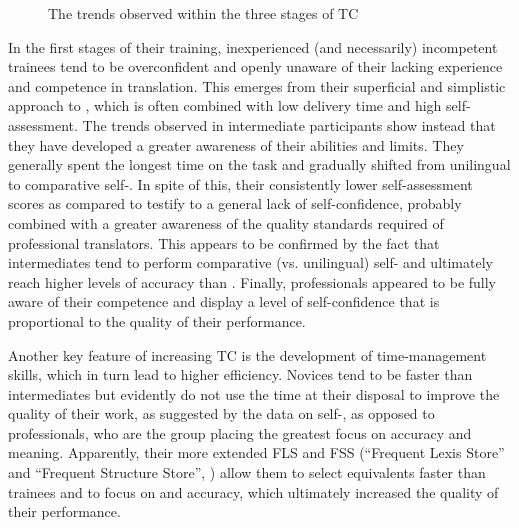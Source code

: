 \documentclass[output=paper]{LSP/langsci}
\begin{document}
\begin{figure}
{
    }
    \caption{The trends observed within the three stages of TC}
    \label{quinci:fig:8}
\end{figure}

In the first stages of their training, inexperienced (and necessarily) incompetent trainees tend to be overconfident and openly unaware of their lacking experience and competence in translation. This emerges from their superficial and simplistic approach to , which is often combined with low delivery time and high self-assessment. The trends observed in intermediate participants show instead that they have developed a greater awareness of their abilities and limits. They generally spent the longest time on the task and gradually shifted from unilingual to comparative self-. In spite of this, their consistently lower self-assessment scores as compared to  testify to a general lack of self-confidence, probably combined with a greater awareness of the quality standards required of professional translators. This appears to be confirmed by the fact that intermediates tend to perform comparative (vs. unilingual) self- and ultimately reach higher levels of accuracy than . Finally, professionals appeared to be fully aware of their competence and display a level of self-confidence that is proportional to the quality of their performance.

Another key feature of increasing TC is the development of time-management skills, which in turn lead to higher efficiency. Novices tend to be faster than intermediates but evidently do not use the time at their disposal to improve the quality of their work, as suggested by the data on self-, as opposed to professionals, who are the group placing the greatest focus on accuracy and meaning. Apparently, their more extended FLS and FSS (``Frequent Lexis Store'' and ``Frequent Structure Store'', \citealt{Bell1991}) allow them to select equivalents faster than trainees and to focus on  and accuracy, which ultimately increased the quality of their performance.
\end{document}
